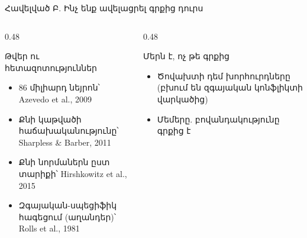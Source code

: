 \begin{frame}{Հավելված Բ. Ինչ ենք ավելացրել գրքից դուրս}
  \begin{columns}[T]
    \begin{column}{0.48\textwidth}
      \begin{card}[colback=mint!30!cardwhite, fontupper=\scriptsize]
        {\blackfont Թվեր ու հետազոտություններ}\par\smallskip
        \begin{itemize}\setlength{\itemsep}{0.5mm}
          \item 86 միլիարդ նեյրոն՝ Azevedo et al., 2009
          \item Քնի կաթվածի հաճախականությունը՝ Sharpless \& Barber, 2011
          \item Քնի նորմաներն ըստ տարիքի՝ Hirshkowitz et al., 2015
          \item Զգայական-սպեցիֆիկ հագեցում (աղանդեր)՝ Rolls et al., 1981
        \end{itemize}
      \end{card}
    \end{column}
    \begin{column}{0.48\textwidth}
      \begin{card}[colback=peach!35!cardwhite, fontupper=\scriptsize]
        {\blackfont Մերն է, ոչ թե գրքից}\par\smallskip
        \begin{itemize}\setlength{\itemsep}{0.5mm}
          \item Ծովախտի դեմ խորհուրդները (բխում են զգայական կոնֆլիկտի վարկածից)
          \item Մեմերը. բովանդակությունը գրքից է
        \end{itemize}
      \end{card}
    \end{column}
  \end{columns}
\end{frame}

